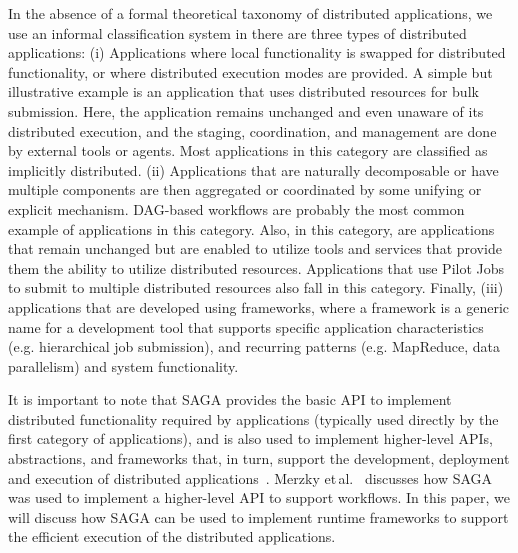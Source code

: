 In the absence of a formal theoretical taxonomy of distributed
applications, %
we use an informal classification system in there are three types of
distributed applications: (i) Applications where local functionality
is swapped for distributed functionality, or where distributed
execution modes are provided.  A simple but illustrative example is an
application that uses distributed resources for bulk submission. Here,
the application remains unchanged and even unaware of its distributed
execution, and the staging, coordination, and management are done by
external tools or agents. Most applications in this category are
classified as implicitly distributed.  (ii) Applications that are
naturally decomposable or have multiple components are then aggregated
or coordinated by some unifying or explicit mechanism.  DAG-based
workflows are probably the most common example of applications in this
category. Also, in this category, are applications that remain
unchanged but are enabled to utilize tools and services that provide
them the ability to utilize distributed resources.  Applications that
use Pilot Jobs to submit to multiple distributed resources also fall
in this category.  Finally, (iii) applications that are developed
using frameworks, where a framework is a generic name for a
development tool that supports specific application characteristics
(e.g. hierarchical job submission), and recurring patterns
(e.g. MapReduce, data parallelism) and system functionality.


It is important to note that SAGA provides the basic API to implement
distributed functionality required by applications (typically used
directly by the first category of applications), and is also used to
implement higher-level APIs, abstractions, and frameworks that, in
turn, support the development, deployment and execution of distributed
applications~\cite{enkf-gmac09}. Merzky et\,al.~\cite{sagamontage09}
discusses how SAGA was used to implement a higher-level API to support
workflows. In this paper, we will discuss how SAGA can be used to
implement runtime frameworks to support the efficient execution of the
distributed applications.

